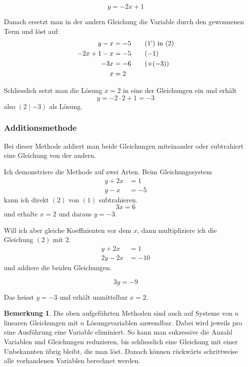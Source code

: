 \documentclass[%
11pt,%
twoside,%
titlepage,%
swissgerman,%
headsepline%
]{scrartcl}
\theoremstyle{definition}
\newtheorem{bem}{Bemerkung}[subsection] %
\theoremstyle{plain}
\begin{document}
	\begin{equation}
		y=-2x+1\tag{1'}
	\end{equation}
	
	Danach ersetzt man in der andern Gleichung die Variable durch den gewonnenen Term und löst auf:
	\begin{align}
		y-x&=-5\tag{1') in (2}\\
		-2x+1-x&=-5\tag{$-1$}\\
		-3x&=-6\tag{$\div(-3)$}\\
		x&=2\notag
	\end{align}
	
	Schliesslich setzt man die Lösung $x=2$ in eine der Gleichungen ein und erhält
	$$y=-2\cdot 2+1=-3$$
	also $(2\mid -3)$ als Lösung.
	
	\subsubsection{Additionsmethode}
	Bei dieser Methode addiert man beide Gleichungen miteinander oder subtrahiert eine Gleichung von der andern.
	
	Ich demonstriere die Methode auf zwei Arten. Beim Gleichungssystem
	\begin{align}
		y+2x&=1\tag{1}\\
		y-x&=-5\tag{2}
	\end{align}
	kann ich direkt $(2)$ von $(1)$ subtrahieren.
	\begin{equation}
		3x=6\tag{$2)-(1$}
	\end{equation}
	und erhalte $x=2$ und daraus $y=-3$.
	
	Will ich aber gleiche Koeffizienten vor dem $x$, dann multipliziere ich die Gleichung $(2)$ mit $2$.
	\begin{align}
		y+2x&=1\tag{1}\\
		2y-2x&=-10\tag{$2\cdot(2)$}
	\end{align}
	und addiere die beiden Gleichungen.
	
	\begin{equation}
		3y=-9\tag{$1)+(2$}
	\end{equation}
	
	Das heisst $y=-3$ und erhält unmittelbar $x=2$.
	
	\begin{bem}
		Die oben aufgeführten Methoden sind auch auf Systeme von $n$ linearen Gleichungen mit $n$ Lösungsvariablen anwendbar. Dabei wird jeweils pro eine Ausführung eine Variable eliminiert. So kann man sukzessive die Anzahl Variablen und Gleichungen reduzieren, bis schliesslich eine Gleichung mit einer Unbekannten übrig bleibt, die man löst. Danach können rückwärts schrittweise alle vorhandenen Variablen berechnet werden.
	\end{bem}
	
\end{document}

